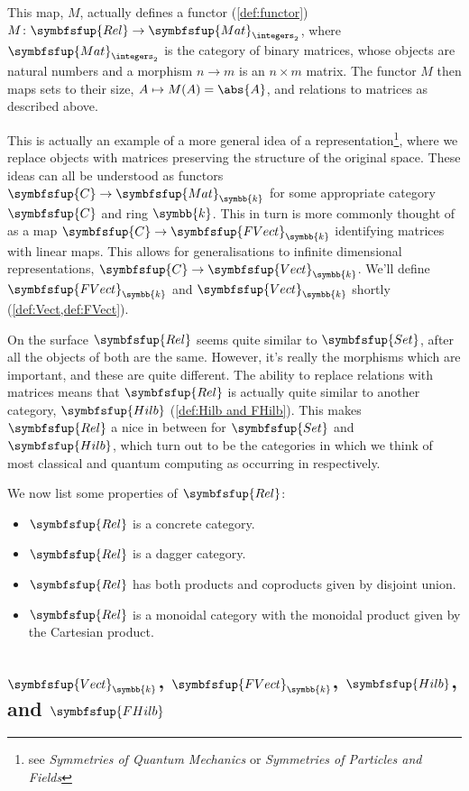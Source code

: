 \documentclass[fleqn]{NotesClass}
\makeatletter
\newcommand*{\course}[1]{\textit{#1}}
\newcommand{\cat}[1]{\symbfsfup{#1}}
\newcommand{\c@egory}[1]{\symbfsfup{#1}}
\newcommand{\Set}{\c@egory{Set}}
\newcommand{\Rel}{\c@egory{Rel}}
\renewcommand{\field}{\symbb{k}}
\newcommand{\Mat}[1][\field]{{\c@egory{Mat}_{#1}}}
\newcommand{\Vect}[1][\field]{{\c@egory{Vect}_{#1}}}
\newcommand{\FVect}[1][\field]{{\c@egory{FVect}_{#1}}}
\newcommand{\Hilb}{\c@egory{Hilb}}
\newcommand{\FHilb}{\c@egory{FHilb}}
\makeatother
\begin{document}
    This map, \(M\), actually defines a functor (\cref{def:functor}) \(M \colon \Rel \to \Mat[\integers_2]\), where \(\Mat[\integers_2]\) is the category of binary matrices, whose objects are natural numbers and a morphism \(n \to m\) is an \(n \times m\) matrix.
    The functor \(M\) then maps sets to their size, \(A \mapsto M(A) = \abs{A}\), and relations to matrices as described above.
    
    This is actually an example of a more general idea of a representation\footnote{see \course{Symmetries of Quantum Mechanics} or \course{Symmetries of Particles and Fields}}, where we replace objects with matrices preserving the structure of the original space.
    These ideas can all be understood as functors \(\cat{C} \to \Mat\) for some appropriate category \(\cat{C}\) and ring \(\field\).
    This in turn is more commonly thought of as a map \(\cat{C} \to \FVect\) identifying matrices with linear maps.
    This allows for generalisations to infinite dimensional representations, \(\cat{C} \to \Vect\).
    We'll define \(\FVect\) and \(\Vect\) shortly (\cref{def:Vect,def:FVect}).
    
    On the surface \(\Rel\) seems quite similar to \(\Set\), after all the objects of both are the same.
    However, it's really the morphisms which are important, and these are quite different.
    The ability to replace relations with matrices means that \(\Rel\) is actually quite similar to another category, \(\Hilb\) (\cref{def:Hilb and FHilb}).
    This makes \(\Rel\) a nice in between for \(\Set\) and \(\Hilb\), which turn out to be the categories in which we think of most classical and quantum computing as occurring in respectively.
    
    We now list some properties of \(\Rel\):
    \begin{itemize}
        \item \(\Rel\) is a concrete category.
        \item \(\Rel\) is a dagger category.
        \item \(\Rel\) has both products and coproducts given by disjoint union.
        \item \(\Rel\) is a monoidal category with the monoidal product given by the Cartesian product.
    \end{itemize}
    
    \subsection{\texorpdfstring{\(\Vect\), \(\FVect\), \(\Hilb\), and \(\FHilb\)}{Vect, FVect, Hilb, and FHilb}}
\end{document}
